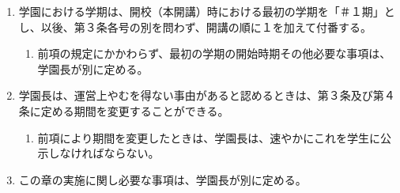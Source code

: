 \begin{enumerate}[label=第\arabic*条　]
\begin{enumerate}[label=\arabic*　,start=2,leftmargin=*]
    \end{enumerate}
  \item 学園における学期は、開校（本開講）時における最初の学期を「＃１期」とし、以後、第３条各号の別を問わず、開講の順に１を加えて付番する。
    \begin{enumerate}[label=\arabic*　,start=2,leftmargin=*]
      \item 前項の規定にかかわらず、最初の学期の開始時期その他必要な事項は、学園長が別に定める。
    \end{enumerate}
  \item 学園長は、運営上やむを得ない事由があると認めるときは、第３条及び第４条に定める期間を変更することができる。
    \begin{enumerate}[label=\arabic*　,start=2,leftmargin=*]
      \item 前項により期間を変更したときは、学園長は、速やかにこれを学生に公示しなければならない。
    \end{enumerate}
  \item この章の実施に関し必要な事項は、学園長が別に定める。
\end{enumerate}